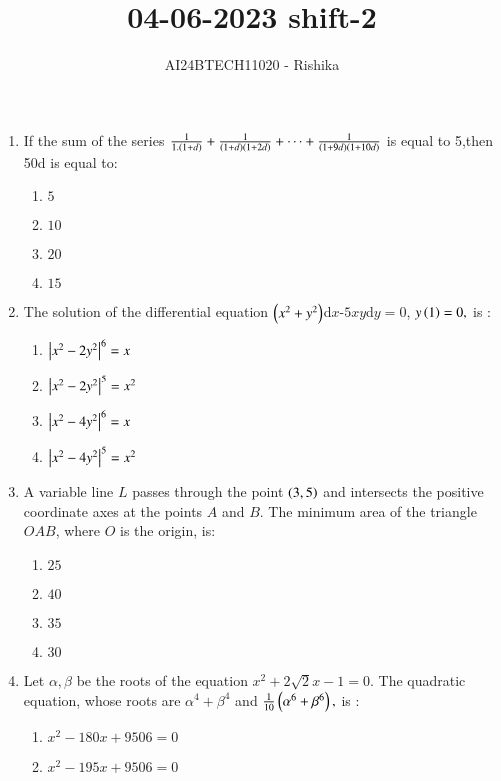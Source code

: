 \documentclass[journal,12pt,onecolumn]{IEEEtran}
\theoremstyle{remark}
\begin{document}

\vspace{3cm}

\title{04-06-2023 shift-2}
\author{AI24BTECH11020 - Rishika}
\maketitle
\bigskip
\renewcommand{\thefigure}{\theenumi}
\renewcommand{\thetable}{\theenumi}
\begin{enumerate}

	\item If the sum of the series $\frac{1}{1.\left(1+d\right)}+\frac{1}{\left(1+d\right)\left(1+2d\right)}+\cdots+\frac{1}{\left(1+9d\right)\left(1+10d\right)}$ is equal to 5,then 50d is equal to:   
     \begin{enumerate}
     \item $5$ \item $10$ \item $20$ \item $15$
     \end{enumerate}
\item The solution of the differential equation $\left(x^2+y^2\right)$d$x$-$5xy$d$y=0$, $y\left(1\right)=0,$ is :
      \begin{enumerate}
      \item $\left\vert x^2-2y^2\right\vert^6=x$
      \item $\left\vert x^2-2y^2\right\vert^5=x^2$
      \item $\left\vert x^2-4y^2\right\vert^6=x$
      \item $\left\vert x^2-4y^2\right\vert^5=x^2$
      \end{enumerate}
\item A variable line $L$ passes through the point $\left(3,5\right)$ and intersects the positive coordinate axes at the points $A$ and $B$. The minimum area of the triangle $OAB$, where $O$ is the origin, is:
     \begin{enumerate}
     \item $25$ \item $40$ \item $35$ \item $30$
     \end{enumerate}
\item Let $\alpha ,\beta $ be the roots of the equation $x^2+2\sqrt{2}x-1=0.$ The quadratic equation, whose roots are $\alpha^4+\beta^4$ and $\frac{1}{10}\left(\alpha^6+\beta^6\right),$ is :
     \begin{enumerate}
     \item $x^2-180x+9506=0$
     \item $x^2-195x+9506=0$

\end{enumerate}
\end{enumerate}
\end{document}
